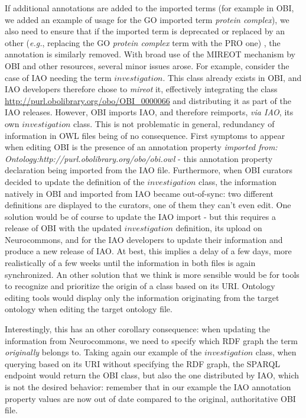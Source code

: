 \documentclass{ao2e}%
\begin{document}
If additional annotations are added to the imported terms (for example in \ac{OBI}, we added an example of usage for the \ac{GO} imported term \textit{protein complex}), we also need to ensure that if the imported term is deprecated or replaced by an other (\emph{e.g.}, replacing  the \ac{GO} \textit{protein complex} term with the \ac{PRO} one)
, the annotation is similarly removed. 
With broad use of the MIREOT mechanism by OBI and other resources, several minor issues arose.
For example, consider the case of \ac{IAO} needing the term $investigation$.  This class already exists in \ac{OBI}, and \ac{IAO} developers therefore chose to \emph{mireot} it, effectively integrating the class \url{http://purl.obolibrary.org/obo/OBI_0000066} and distributing it as part of the \ac{IAO} releases.
However, \ac{OBI} imports \ac{IAO}, and therefore reimports, \emph{via IAO}, its own $investigation$ class. This is not problematic in general, redundancy of information in OWL files being of no consequence. First symptoms to appear when editing \ac{OBI} is the presence of an annotation property \emph{imported from: Ontology:http://purl.obolibrary.org/obo/obi.owl} - this annotation property declaration being imported from the IAO file.
Furthermore, when \ac{OBI} curators decided to update the definition of the $investigation$ class, the information natively in \ac{OBI} and imported from \ac{IAO} became out-of-sync: two different definitions are displayed to the curators, one of them they can't even edit.
One solution would be of course to update the \ac{IAO} import - but this requires a release of \ac{OBI} with the updated $investigation$ definition, its upload on Neurocommons, and for the \ac{IAO} developers to update their information and produce a new release of \ac{IAO}. At best, this implies a delay of a few days, more realistically of a few weeks until the information in both files is again synchronized.
An other solution that we think is more sensible would be for tools to recognize and prioritize the origin of a class based on its URI. Ontology editing tools would display only the information originating from the target ontology when editing the target ontology file.

Interestingly, this has an other corollary consequence: when updating the information from Neurocommons, we need to specify which \ac{RDF} graph \cite{RDF} the term \emph{originally} belongs to. Taking again our example of the $investigation$ class, when querying based on its URI without specifying the RDF graph, the SPARQL endpoint would return the \ac{OBI} class, but also the one distributed by \ac{IAO}, which is not the desired behavior: remember that in our example the \ac{IAO} annotation property values are now out of date compared to the original, authoritative \ac{OBI} file.
\end{document}
